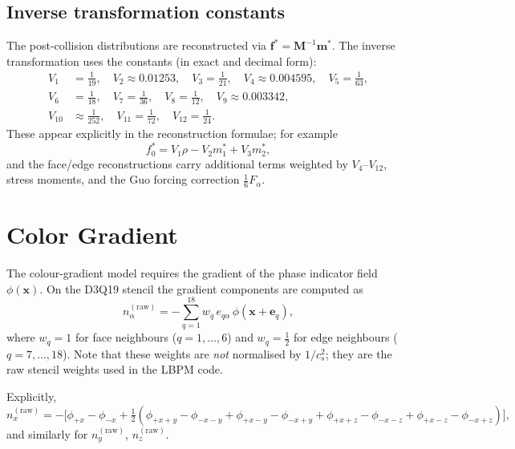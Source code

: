 \documentclass[11pt,a4paper]{article}
\newcommand{\vect}[1]{\bm{#1}}
\newcommand{\tens}[1]{\bm{#1}}
\begin{document}
\subsection{Inverse transformation constants}
\label{sec:invconst}

The post-collision distributions are reconstructed via
$\vect{f}^* = \tens{M}^{-1}\vect{m}^*$.  The inverse transformation
uses the constants (in exact and decimal form):
\begin{align}
  V_1 &= \tfrac{1}{19},\quad
  V_2 \approx 0.01253,\quad
  V_3 = \tfrac{1}{21},\quad
  V_4 \approx 0.004595,\quad
  V_5 = \tfrac{1}{63},\nonumber\\
  V_6 &= \tfrac{1}{18},\quad
  V_7 = \tfrac{1}{36},\quad
  V_8 = \tfrac{1}{12},\quad
  V_9 \approx 0.003342,\nonumber\\
  V_{10} &\approx \tfrac{1}{252},\quad
  V_{11} = \tfrac{1}{72},\quad
  V_{12} = \tfrac{1}{24}.
  \label{eq:Vconst}
\end{align}
These appear explicitly in the reconstruction formulae; for example
\begin{equation}
  f_0^* = V_1\rho - V_2 m_1^* + V_3 m_2^*,
  \label{eq:f0recon}
\end{equation}
and the face/edge reconstructions carry additional terms weighted by
$V_4$--$V_{12}$, stress moments, and the Guo forcing correction
$\tfrac{1}{6}F_\alpha$.

\section{Color Gradient}
\label{sec:gradient}

The colour-gradient model requires the gradient of the phase indicator field
$\phi(\vect{x})$.  On the D3Q19 stencil the gradient components are
computed as
\begin{equation}
  n_\alpha^{(\text{raw})} = -\sum_{q=1}^{18} w_q\, e_{q\alpha}\,
  \phi(\vect{x}+\vect{e}_q),
  \label{eq:gradient}
\end{equation}
where $w_q = 1$ for face neighbours ($q=1,\ldots,6$) and $w_q =
\tfrac{1}{2}$ for edge neighbours ($q=7,\ldots,18$).  Note that these
weights are \emph{not} normalised by $1/c_s^2$; they are the raw
stencil weights used in the LBPM code.

Explicitly,
\begin{equation}
  n_x^{(\text{raw})} = -\bigl[\phi_{+x}-\phi_{-x}
  +\tfrac{1}{2}(\phi_{+x+y}-\phi_{-x-y}+\phi_{+x-y}-\phi_{-x+y}
  +\phi_{+x+z}-\phi_{-x-z}+\phi_{+x-z}-\phi_{-x+z})\bigr],
  \label{eq:nxexplicit}
\end{equation}
and similarly for $n_y^{(\text{raw})}$, $n_z^{(\text{raw})}$.
\end{document}
